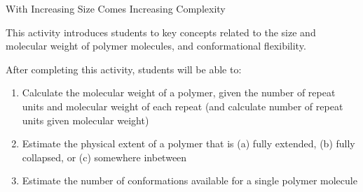 %
%
%
%

\renewcommand{\figpath}{content/intro/size-and-complexity/figs}
\renewcommand{\labelbase}{size-and-complexity}

\begin{activity}{With Increasing Size Comes Increasing Complexity}

\begin{instructornotes}

	This activity introduces students to key concepts related to the size and molecular weight of polymer molecules, and conformational flexibility.
	
	After completing this activity, students will be able to:
			\begin{enumerate}
				\item Calculate the molecular weight of a polymer, given the number of repeat units and molecular weight of each repeat (and calculate number of repeat units given molecular weight)
				\item Estimate the physical extent of a polymer that is (a) fully extended, (b) fully collapsed, or (c) somewhere inbetween
				\item Estimate the number of conformations available for a single polymer molecule
			\end{enumerate}
			

\end{instructornotes}
\end{activity}
